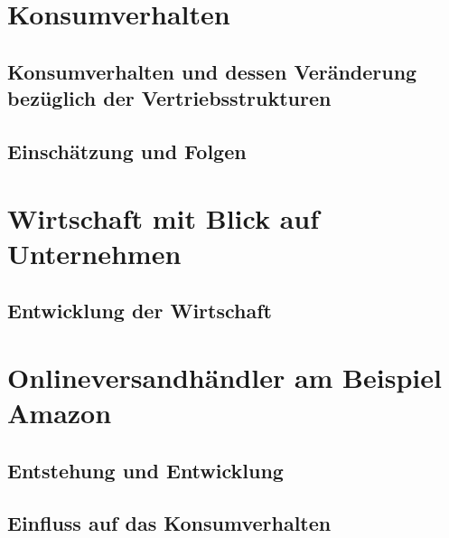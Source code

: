 \documentclass[a4paper, 12pt]{scrartcl}
\begin{document}
    \section{Konsumverhalten}
            
        \subsection{Konsumverhalten und dessen Veränderung bezüglich der Vertriebsstrukturen}
            
            
        \subsection{Einschätzung und Folgen}
            
        \newpage
            
            
            
    \section{Wirtschaft mit Blick auf Unternehmen}
            
        \subsection{Entwicklung der Wirtschaft}
            
        \newpage
        
        
        
    \section{Onlineversandhändler am Beispiel Amazon} 
        
        \subsection{Entstehung und Entwicklung}
            
            
        \subsection{Einfluss auf das Konsumverhalten } %
            
        \newpage
            
\end{document}
